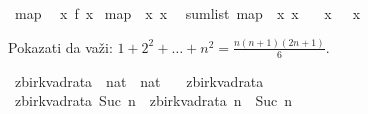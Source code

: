 \begin{isabellebody}
\begin{exercise}[subtitle=Tip: list.]
\isanewline
{}\isamarkupfalse%
\ map\isanewline
{}\isamarkupfalse%
\ {\isachardoublequoteopen}{\isasymlambda}\ x{\isachardot}{\kern0pt}\ f\ x{\isachardoublequoteclose}\isanewline
{}\isamarkupfalse%
\ {\isachardoublequoteopen}map\ {\isacharparenleft}{\kern0pt}{\isasymlambda}\ x{\isachardot}{\kern0pt}\ x{\isacharcircum}{\kern0pt}{}{\isacharparenright}{\kern0pt}\ {\isacharbrackleft}{\kern0pt}{}{\isachardot}{\kern0pt}{\isachardot}{\kern0pt}{\isacharless}{\kern0pt}{}{\isacharbrackright}{\kern0pt}{\isachardoublequoteclose}\isanewline
{}\isamarkupfalse%
\ {\isachardoublequoteopen}sum{\isacharunderscore}{\kern0pt}list\ {\isacharparenleft}{\kern0pt}map\ {\isacharparenleft}{\kern0pt}{\isasymlambda}\ x{\isachardot}{\kern0pt}\ x{\isacharcircum}{\kern0pt}{}{\isacharparenright}{\kern0pt}\ {\isacharbrackleft}{\kern0pt}{}{\isachardot}{\kern0pt}{\isachardot}{\kern0pt}{\isacharless}{\kern0pt}{}{\isacharbrackright}{\kern0pt}{\isacharparenright}{\kern0pt}{\isachardoublequoteclose}\isanewline
\isanewline
{}\isamarkupfalse%
\ {\isachardoublequoteopen}{\isasymSum}\ x\ {\isasymleftarrow}\ {\isacharbrackleft}{\kern0pt}{}{\isachardot}{\kern0pt}{\isachardot}{\kern0pt}{\isacharless}{\kern0pt}{}{\isacharbrackright}{\kern0pt}{\isachardot}{\kern0pt}\ x{\isacharcircum}{\kern0pt}{}{\isachardoublequoteclose}%
\end{exercise}
%
\begin{exercise}[subtitle=Sumiranje nizova preko listi.]
%
\begin{isamarkuptext}%
Pokazati da važi: $1 + 2^2 + \ldots + n^2 = \frac{n (n + 1) (2n + 1)}{6}$.%
\end{isamarkuptext}\isamarkuptrue%
\isamarkupfalse%
\ zbir{\isacharunderscore}{\kern0pt}kvadrata\ {\isacharcolon}{\kern0pt}{\isacharcolon}{\kern0pt}\ {\isachardoublequoteopen}nat\ {\isasymRightarrow}\ nat{\isachardoublequoteclose}\ \isanewline
\ \ {\isachardoublequoteopen}zbir{\isacharunderscore}{\kern0pt}kvadrata\ {}\ {\isacharequal}{\kern0pt}\ {}{\isachardoublequoteclose}\isanewline
{\isacharbar}{\kern0pt}\ {\isachardoublequoteopen}zbir{\isacharunderscore}{\kern0pt}kvadrata\ {\isacharparenleft}{\kern0pt}Suc\ n{\isacharparenright}{\kern0pt}\ {\isacharequal}{\kern0pt}\ zbir{\isacharunderscore}{\kern0pt}kvadrata\ n\ {\isacharplus}{\kern0pt}\ {\isacharparenleft}{\kern0pt}Suc\ n{\isacharparenright}{\kern0pt}\ {\isacharcircum}{\kern0pt}\ {}{\isachardoublequoteclose}%

\end{exercise}
\end{isabellebody}
